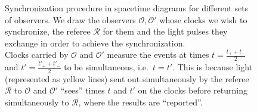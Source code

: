 \documentclass[../relativity_main.tex]{subfiles}
\begin{document}
\begin{figure}
\begin{minipage}{0.5\textwidth}
	\end{minipage}%
	\begin{minipage}{0.5\textwidth}
		\caption[Synchronization procedure in spacetime diagrams for different sets of observers]{Synchronization procedure in spacetime diagrams for different sets of observers. We draw the observers $\mathcal{O}, \mathcal{O}'$ whose clocks we wish to synchronize, the referee $\mathcal{R}$ for them and the light pulses they exchange in order to achieve the synchronization.\\
		Clocks carried by $\mathcal{O}$ and $\mathcal{O}'$ measure the events at times $t = \frac{t_+ + t_-}{2}$ and $t' = \frac{t'_+ + t'_-}{2}$ to be simultaneous, i.e.~$t = t'$. This is because light (represented as yellow lines) sent out simultaneously by the referee $\mathcal{R}$ to $\mathcal{O}$ and $\mathcal{O}'$ \enquote{sees} times $t$ and $t'$ on the clocks before returning simultaneously to $\mathcal{R}$, where the results are \enquote{reported}.}
		\label{fig:clocks_at_rest_wrt_each_other}
	\end{minipage}
\end{figure}
\end{document}
